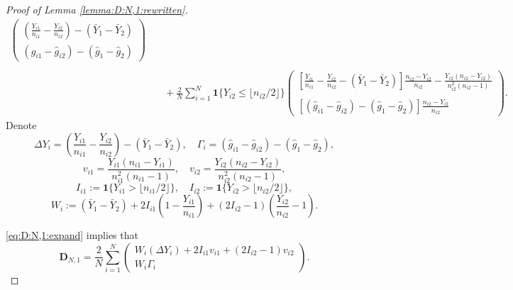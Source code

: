 \documentclass[10pt,a4paper]{amsart}
\begin{document}
\begin{proof}[Proof of Lemma \ref{lemma:D:N,1:rewritten}]
\begin{equation}
\begin{array}{rl}
\begin{pmatrix}
\displaystyle\left(\frac{Y_{i1}}{n_{i1}}-\frac{Y_{i2}}{n_{i2}}\right)-(\bar{Y}_1-\bar{Y}_2)\\
\displaystyle(\hat{g}_{i1}-\hat{g}_{i2})-(\hat{g}_1-\hat{g}_2)
\end{pmatrix}\\
\\
&\displaystyle\quad+\frac{2}{N}\sum_{i=1}^N\mathbf{1}\{Y_{i2}\leq \lfloor n_{i2}/2\rfloor\}\begin{pmatrix}
\displaystyle\left[\frac{Y_{i1}}{n_{i1}}-\frac{Y_{i2}}{n_{i2}}-(\bar{Y}_1-\bar{Y}_2)\right]\frac{n_{i2}-Y_{i2}}{n_{i2}}-\frac{Y_{i2}(n_{i2}-Y_{i2})}{n_{i2}^2(n_{i2}-1)}\\
\\
\displaystyle[(\hat{g}_{i1}-\hat{g}_{i2})-(\hat{g}_1-\hat{g}_2)]\frac{n_{i2}-Y_{i2}}{n_{i2}}
\end{pmatrix}.
\end{array}
\end{equation}
Denote 
$$\Delta Y_i=\left(\frac{Y_{i1}}{n_{i1}}-\frac{Y_{i2}}{n_{i2}}\right)-(\bar{Y}_1-\bar{Y}_2),\quad \Gamma_i=(\hat{g}_{i1}-\hat{g}_{i2})-(\hat{g}_1-\hat{g}_2),$$
$$v_{i1}=\frac{Y_{i1}(n_{i1}-Y_{i1})}{n_{i1}^2(n_{i1}-1)},\quad v_{i2}=\frac{Y_{i2}(n_{i2}-Y_{i2})}{n_{i2}^2(n_{i2}-1)},$$
$$I_{i1}:=\mathbf{1}\{Y_{i1}>\lfloor n_{i1}/2\rfloor\},\quad I_{i2}:=\mathbf{1}\{Y_{i2}>\lfloor n_{i2}/2\rfloor\},$$
$$W_i:=(\bar{Y}_1-\bar{Y}_2)+2I_{i1}\left(1-\frac{Y_{i1}}{n_{i1}}\right)+(2I_{i2}-1)\left(\frac{Y_{i2}}{n_{i2}}-1\right).$$

\eqref{eq:D:N,1:expand} implies that
$$\mathbf{D}_{N,1}=\frac{2}{N}\sum_{i=1}^N\begin{pmatrix}
    W_i(\Delta Y_i)+2I_{i1}v_{i1}+(2I_{i2}-1)v_{i2}\\
    W_i\Gamma_i
\end{pmatrix}.$$

\end{proof}
\end{document}
